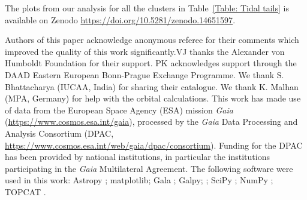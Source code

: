 \documentclass{aa}
\begin{document}
The plots from our analysis for all the clusters in Table~\ref{Table: Tidal tails} is available on Zenodo \href{https://doi.org/10.5281/zenodo.14651597}{https://doi.org/10.5281/zenodo.14651597}. 


\begin{acknowledgements}
    Authors of this paper acknowledge anonymous referee for their comments which improved the quality of this work significantly.VJ thanks the Alexander von Humboldt Foundation for their support.
    PK acknowledges support through the DAAD Eastern European Bonn-Prague Exchange Programme. 
    We thank S. Bhattacharya (IUCAA, India) for sharing their catalogue.
    We thank K. Malhan (MPA, Germany) for help with the orbital calculations.
    This work has made use of data from the European Space Agency (ESA) mission {\it Gaia} (\url{https://www.cosmos.esa.int/gaia}), processed by the {\it Gaia} Data Processing and Analysis Consortium (DPAC, \url{https://www.cosmos.esa.int/web/gaia/dpac/consortium}). Funding for the DPAC has been provided by national institutions, in particular the institutions participating in the {\it Gaia} Multilateral Agreement.
    The following software were used in this work: Astropy \citep{astropy:2022}; matplotlib; Gala \citep{2017JOSS....2..388Price}; Galpy\citep{Bovy2015ApJS..216...29B}; \citep{2007CSE.....9...90Hunter}; SciPy \citep{2020SciPy-NMeth}; NumPy \citep{2020Natur.585..357Harris}; TOPCAT \citep{2005ASPC..347...29TOPCAT}.
\end{acknowledgements}

\end{document}
